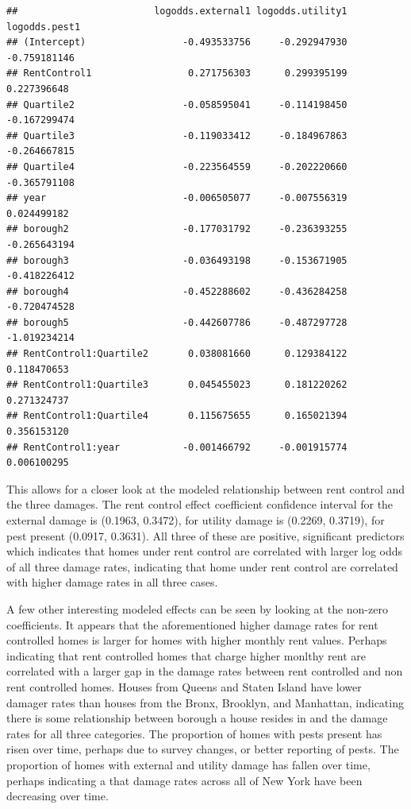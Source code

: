 \documentclass[11pt]{asaproc}\usepackage[]{graphicx}\usepackage[]{color}
\makeatletter
\newenvironment{kframe}{%
 \def\at@end@of@kframe{}%
 \ifinner\ifhmode%
  \def\at@end@of@kframe{\end{minipage}}%
  \begin{minipage}{\columnwidth}%
 \fi\fi%
 \def\FrameCommand##1{\hskip\@totalleftmargin \hskip-\fboxsep
 \colorbox{shadecolor}{##1}\hskip-\fboxsep
     \hskip-\linewidth \hskip-\@totalleftmargin \hskip\columnwidth}%
 \MakeFramed {\advance\hsize-\width
   \@totalleftmargin\z@ \linewidth\hsize
   \@setminipage}}%
 {\par\unskip\endMakeFramed%
 \at@end@of@kframe}
\newenvironment{knitrout}{}{} %
\makeatother
\begin{document}
\begin{knitrout}
\color{fgcolor}\begin{kframe}
\begin{verbatim}
##                        logodds.external1 logodds.utility1 logodds.pest1
## (Intercept)                 -0.493533756     -0.292947930  -0.759181146
## RentControl1                 0.271756303      0.299395199   0.227396648
## Quartile2                   -0.058595041     -0.114198450  -0.167299474
## Quartile3                   -0.119033412     -0.184967863  -0.264667815
## Quartile4                   -0.223564559     -0.202220660  -0.365791108
## year                        -0.006505077     -0.007556319   0.024499182
## borough2                    -0.177031792     -0.236393255  -0.265643194
## borough3                    -0.036493198     -0.153671905  -0.418226412
## borough4                    -0.452288602     -0.436284258  -0.720474528
## borough5                    -0.442607786     -0.487297728  -1.019234214
## RentControl1:Quartile2       0.038081660      0.129384122   0.118470653
## RentControl1:Quartile3       0.045455023      0.181220262   0.271324737
## RentControl1:Quartile4       0.115675655      0.165021394   0.356153120
## RentControl1:year           -0.001466792     -0.001915774   0.006100295
\end{verbatim}
\end{kframe}
\end{knitrout}


This allows for a closer look at the modeled relationship between rent control and the three damages. The rent control effect coefficient confidence interval for the external damage is (0.1963, 0.3472), for utility damage is (0.2269, 0.3719), for pest present (0.0917, 0.3631). All three of these are positive, significant predictors which indicates that homes under rent control are correlated with larger log odds of all three damage rates, indicating that home under rent control are correlated with higher damage rates in all three cases.

A few other interesting modeled effects can be seen by looking at the non-zero coefficients. It appears that the aforementioned higher damage rates for rent controlled homes is larger for homes with higher monthly rent values. Perhaps indicating that rent controlled homes that charge higher monlthy rent are correlated with a larger gap in the damage rates between rent controlled and non rent controlled homes. Houses from Queens and Staten Island have lower damager rates than houses from the Bronx, Brooklyn, and Manhattan, indicating there is some relationship between borough a house resides in and the damage rates for all three categories. The proportion of homes with pests present has risen over time, perhaps due to survey changes, or better reporting of pests. The proportion of homes with external and utility damage has fallen over time, perhaps indicating a that damage rates across all of New York have been decreasing over time.
\end{document}
